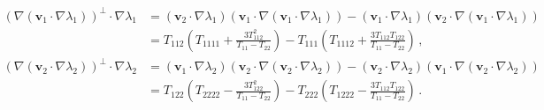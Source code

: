 \documentclass[a4paper, 11pt]{article}
\begin{document}
\begin{align}
(\nabla(\bm{v}_1 \cdot \nabla \lambda_1))^\perp \cdot \nabla \lambda_1 
&=(\bm{v}_2 \cdot \nabla \lambda_1) (\bm{v}_1 \cdot \nabla (\bm{v}_1 \cdot \nabla \lambda_1))
-(\bm{v}_1 \cdot \nabla \lambda_1)(\bm{v}_2 \cdot \nabla (\bm{v}_1 \cdot \nabla \lambda_1))\nonumber\\
&=T_{112} \left(T_{1111}+\frac{3T_{112}^2}{T_{11}-T_{22}}\right)-T_{111}\left(T_{1112}+\frac{3T_{112}T_{122}}{T_{11}-T_{22}}\right)\,,\\
(\nabla(\bm{v}_2 \cdot \nabla \lambda_2))^\perp \cdot \nabla \lambda_2 
&=(\bm{v}_1 \cdot \nabla \lambda_2) (\bm{v}_2 \cdot \nabla (\bm{v}_2 \cdot \nabla \lambda_2))
-(\bm{v}_2 \cdot \nabla \lambda_2)(\bm{v}_1 \cdot \nabla (\bm{v}_2 \cdot \nabla \lambda_2))\nonumber\\
&=T_{122} \left(T_{2222}-\frac{3T_{122}^2}{T_{11}-T_{22}}\right)-T_{222}\left(T_{1222}-\frac{3T_{112}T_{122}}{T_{11}-T_{22}}\right)\,.
\end{align}

\end{document}
